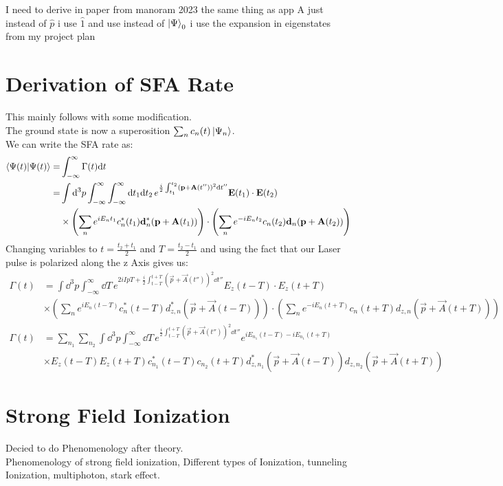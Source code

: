 I need to derive in paper from manoram 2023 the same thing as app A just instead of $\hat{p}$ i use $\hat{1}$ and use instead of $\ket{\Psi}_0$ i use the expansion in eigenstates from my project plan


\newpage
\section{Derivation of SFA Rate}
This mainly follows \cite{Theory_NPS} with some modification.\\
The ground state is now a superosition $\sum_{n}c_n(t)\ket{\Psi_n}$.\\
We can write the SFA rate as:
\begin{align*}
    \braket{\Psi(t)|\Psi(t)} = &\int_{-\infty}^{\infty} \Gamma(t) \mathrm{d} t\\ 
    = &\int \mathrm{d}^3 p \int_{-\infty}^{\infty} \int_{-\infty}^{\infty} \mathrm{d} t_1  \mathrm{d} t_2 \, e^{\frac{i}{2}\int_{t_1}^{t_2}(\mathbf{p}+\mathbf{A}(t''))^2\mathrm{d} t''} \mathbf{E}(t_1)\cdot\mathbf{E}(t_2)\\
    &\times\left(\sum_{n}e^{iE_nt_1}c_n^*(t_1)\mathbf{d}_n^*(\mathbf{p}+\mathbf{A}(t_1))\right)\cdot\left(\sum_{n}e^{-iE_nt_2}c_n(t_2)\mathbf{d}_n(\mathbf{p}+\mathbf{A}(t_2))\right)
\end{align*}
Changing variables to $t=\frac{t_2+t_1}{2}$ and $T=\frac{t_2-t_1}{2}$ and using the fact that our Laser pulse is polarized along the z Axis gives us:
\begin{align*}
    \Gamma(t) &= \int \dd^3 p \int_{-\infty}^{\infty} \dd T \, e^{2iIpT+\frac{i}{2}\int_{t-T}^{t+T}(\vec{p}+\vec{A}(t''))^2\dd t''} E_z(t-T)\cdot E_z(t+T)\\
    &\times\left(\sum_{n}e^{iE_n(t-T)}c_n^*(t-T)d_{z,n}^*(\vec{p}+\vec{A}(t-T))\right)\cdot\left(\sum_{n}e^{-iE_n(t+T)}c_n(t+T)d_{z,n}(\vec{p}+\vec{A}(t+T))\right)
\end{align*}
\begin{align*}
    \Gamma(t) &= \sum_{n_1}\sum_{n_2}\int \dd^3 p \int_{-\infty}^{\infty} \dd T \, e^{\frac{i}{2}\int_{t-T}^{t+T}(\vec{p}+\vec{A}(t''))^2\dd t''} e^{iE_{n_1}(t-T)-iE_{n_1}(t+T)}\\
    &\times E_z(t-T) E_z(t+T)c_{n_1}^*(t-T)c_{n_2}(t+T) d_{z,n_1}^*(\vec{p}+\vec{A}(t-T))d_{z,n_2}(\vec{p}+\vec{A}(t+T))
\end{align*}


\newpage
\section{Strong Field Ionization}
Decied to do Phenomenology after theory.\\
Phenomenology of strong field ionization, Different types of Ionization, tunneling Ionization, multiphoton, stark effect.

